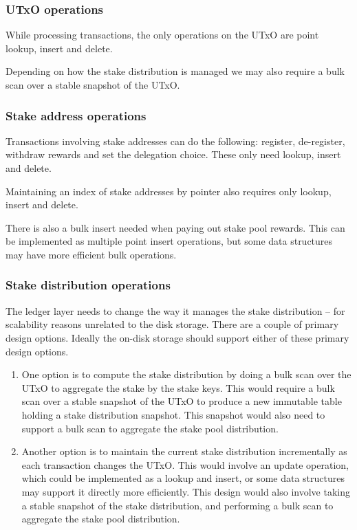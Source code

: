 \documentclass[11pt,a4paper]{article}
\begin{document}
\subsubsection{UTxO operations}

While processing transactions, the only operations on the UTxO are point
{\sc lookup}, {\sc insert} and {\sc delete}.

Depending on how the stake distribution is managed we may also require a
bulk {\sc scan} over a stable snapshot of the UTxO.


\subsubsection{Stake address operations}

Transactions involving stake addresses can do the following: register,
de-register, withdraw rewards and set the delegation choice. These only need
{\sc lookup}, {\sc insert} and {\sc delete}.

Maintaining an index of stake addresses by pointer also requires only
{\sc lookup}, {\sc insert} and {\sc delete}.

There is also a bulk {\sc insert} needed when paying out stake pool rewards.
This can be implemented as multiple point {\sc insert} operations, but some
data structures may have more efficient bulk operations.

\subsubsection{Stake distribution operations}

The ledger layer needs to change the way it manages the stake distribution --
for scalability reasons unrelated to the disk storage. There are a couple of
primary design options. Ideally the on-disk storage should support either of
these primary design options.

\begin{enumerate}
\item One option is to compute the stake distribution by doing a bulk {\sc scan}
      over the UTxO to aggregate the stake by the stake keys. This would
      require a bulk {\sc scan} over a stable snapshot of the UTxO to produce a
      new immutable table holding a stake distribution snapshot. This snapshot
      would also need to support a bulk {\sc scan} to aggregate the stake pool
      distribution.

\item Another option is to maintain the current stake distribution incrementally
      as each transaction changes the UTxO. This would involve an {\sc update}
      operation, which could be implemented as a {\sc lookup} and {\sc insert},
      or some data structures may support it directly more efficiently. This
      design would also involve taking a stable snapshot of the stake
      distribution, and performing a bulk {\sc scan} to aggregate the stake pool
      distribution.
\end{enumerate}
\end{document}
